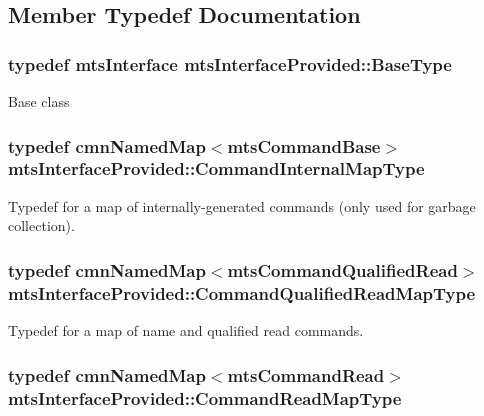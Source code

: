 \subsection{Member Typedef Documentation}
\hypertarget{classmts_interface_provided_a7c7eb6689ef61272efe9bfcabeecdbc6}{
\subsubsection[{Base\-Type}]{\setlength{\rightskip}{0pt plus 5cm}typedef {\bf mts\-Interface} {\bf mts\-Interface\-Provided\-::\-Base\-Type}}}\label{classmts_interface_provided_a7c7eb6689ef61272efe9bfcabeecdbc6}
Base class \hypertarget{classmts_interface_provided_afbea756c205cd50db2a0884681ad650a}{
\subsubsection[{Command\-Internal\-Map\-Type}]{\setlength{\rightskip}{0pt plus 5cm}typedef {\bf cmn\-Named\-Map}$<${\bf mts\-Command\-Base}$>$ {\bf mts\-Interface\-Provided\-::\-Command\-Internal\-Map\-Type}}}\label{classmts_interface_provided_afbea756c205cd50db2a0884681ad650a}
Typedef for a map of internally-\/generated commands (only used for garbage collection). \hypertarget{classmts_interface_provided_a08e212add6d96324bf5e029d09349a04}{
\subsubsection[{Command\-Qualified\-Read\-Map\-Type}]{\setlength{\rightskip}{0pt plus 5cm}typedef {\bf cmn\-Named\-Map}$<${\bf mts\-Command\-Qualified\-Read}$>$ {\bf mts\-Interface\-Provided\-::\-Command\-Qualified\-Read\-Map\-Type}}}\label{classmts_interface_provided_a08e212add6d96324bf5e029d09349a04}
Typedef for a map of name and qualified read commands. \hypertarget{classmts_interface_provided_ab6a636c8cfda921a078ae1df8d90e087}{
\subsubsection[{Command\-Read\-Map\-Type}]{\setlength{\rightskip}{0pt plus 5cm}typedef {\bf cmn\-Named\-Map}$<${\bf mts\-Command\-Read}$>$ {\bf mts\-Interface\-Provided\-::\-Command\-Read\-Map\-Type}}}\label{classmts_interface_provided_ab6a636c8cfda921a078ae1df8d90e087}
